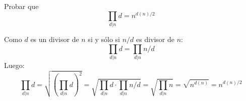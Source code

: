 \documentclass[twoside]{article}
\begin{document}
\begin{ejercicio}{13}
\newpage

\begin{ejercicio}{15}
Probar que
\[ \prod_{d|n} d = n^{d(n)/2} \]
\end{ejercicio}

\begin{sol}
Como $d$ es un divisor de $n$ si y sólo si $n/d$ es divisor de $n$:
\[ \prod_{d|n} d = \prod_{d|n} n/d \]
Luego:
\[ \prod_{d|n} d = \sqrt{\left(\prod_{d|n} d\right)^2} = \sqrt{\prod_{d|n} d \cdot \prod_{d|n} n/d} = \sqrt{\prod_{d|n} n} = \sqrt{n^{d(n)}} = n^{d(n)/2} \]
\end{sol}
\end{ejercicio}
\end{document}
